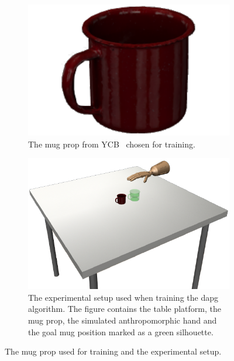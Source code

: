 \begin{figure}[!h]
	\centering
	\begin{subfigure}[b]{0.48\textwidth}
		\centering
		\includegraphics[width=\textwidth]{chapters/3-in-hand-manipulation/fig/mug.pdf}
		\caption{The mug prop from YCB~\cite{ycb} chosen for training.\newline}
		\label{fig:manipulation-mug}
	\end{subfigure}
	\hfill
	\begin{subfigure}[b]{0.48\textwidth}
		\centering
		\includegraphics[width=\textwidth]{chapters/3-in-hand-manipulation/fig/experimental-setup-dapg.pdf}
		\caption{The experimental setup used when training the \gls{dapg} algorithm. The figure contains the table platform, the mug prop, the simulated anthropomorphic hand and the goal mug position marked as a green silhouette.}
		\label{fig:experimental-setup-dapg}
	\end{subfigure}
	\caption{The mug prop used for training and the experimental setup.}
	\label{fig:manipulation-mug-experimental-setup-dapg}
\end{figure}

